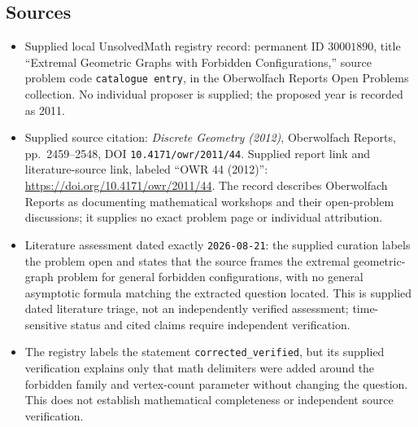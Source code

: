 \documentclass[11pt]{article}
\begin{document}
\subsection{Sources}
\begin{itemize}
\item Supplied local UnsolvedMath registry record: permanent ID \(30001890\), title ``Extremal Geometric Graphs with Forbidden Configurations,'' source problem code \texttt{catalogue entry}, in the Oberwolfach Reports Open Problems collection. No individual proposer is supplied; the proposed year is recorded as 2011.
\item Supplied source citation: \emph{Discrete Geometry (2012)}, Oberwolfach Reports, pp.\ 2459--2548, DOI \texttt{10.4171/owr/2011/44}. Supplied report link and literature-source link, labeled ``OWR 44 (2012)'': \url{https://doi.org/10.4171/owr/2011/44}. The record describes Oberwolfach Reports as documenting mathematical workshops and their open-problem discussions; it supplies no exact problem page or individual attribution.
\item Literature assessment dated exactly \texttt{2026-08-21}: the supplied curation labels the problem open and states that the source frames the extremal geometric-graph problem for general forbidden configurations, with no general asymptotic formula matching the extracted question located. This is supplied dated literature triage, not an independently verified assessment; time-sensitive status and cited claims require independent verification.
\item The registry labels the statement \texttt{corrected\_verified}, but its supplied verification explains only that math delimiters were added around the forbidden family and vertex-count parameter without changing the question. This does not establish mathematical completeness or independent source verification.
\end{itemize}
\end{document}
